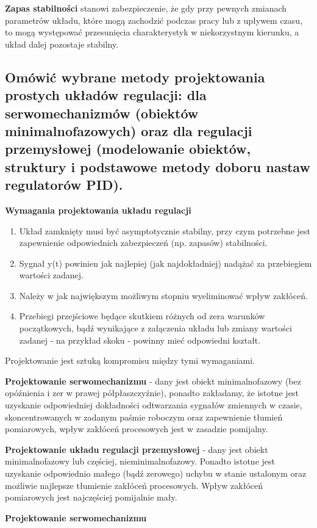 \textbf{Zapas stabilności} stanowi zabezpieczenie, że gdy przy pewnych zmianach parametrów układu, które mogą zachodzić podczas pracy lub z upływem czasu, to mogą występować przesunięcia charakterystyk w niekorzystnym kierunku, a układ dalej pozostaje stabilny.


\subsection{Omówić wybrane metody projektowania prostych układów regulacji: dla serwomechanizmów (obiektów minimalnofazowych) oraz dla regulacji przemysłowej (modelowanie obiektów, struktury i podstawowe metody doboru nastaw regulatorów PID).}

\textbf{Wymagania projektowania układu regulacji}
\begin{enumerate}
    \item Układ zamknięty musi być asymptotycznie stabilny, przy czym potrzebne jest zapewnienie odpowiednich zabezpieczeń (np. zapasów) stabilności.
    \item Sygnał y(t) powinien jak najlepiej (jak najdokładniej) nadążać za przebiegiem wartości zadanej.
    \item Należy w jak największym możliwym stopniu wyeliminować wpływ zakłóceń.
    \item Przebiegi przejściowe będące skutkiem różnych od zera warunków początkowych, bądź wynikające z załączenia układu lub zmiany wartości zadanej - na przykład skoku - powinny mieć odpowiedni kształt.
\end{enumerate}

Projektowanie jest sztuką kompromisu między tymi wymaganiami.

\textbf{Projektowanie serwomechanizmu} - dany jest obiekt minimalnofazowy (bez opóźnienia i zer w prawej półpłaszczyźnie), ponadto zakładamy, że istotne jest uzyskanie odpowiedniej dokładności odtwarzania sygnałów zmiennych w czasie, skoncentrowanych w zadanym paśmie roboczym oraz zapewnienie tłumień pomiarowych, wpływ zakłóceń procesowych jest w zasadzie pomijalny.

\textbf{Projektowanie układu regulacji przemysłowej} - dany jest obiekt minimalnofazowy lub częściej, nieminimalnofazowy. Ponadto istotne jest uzyskanie odpowiednio małego (bądź zerowego) uchybu w stanie ustalonym oraz możliwie najlepsze tłumienie zakłóceń procesowych. Wpływ zakłóceń pomiarowych jest najczęściej pomijalnie mały.

\textbf{Projektowanie serwomechanizmu}

